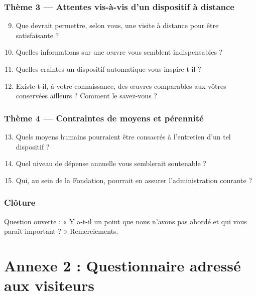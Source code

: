 \subsection*{Thème 3 — Attentes vis-à-vis d'un dispositif à distance}

\begin{enumerate}\setcounter{enumi}{8}
  \item Que devrait permettre, selon vous, une visite à distance pour être
        satisfaisante ?
  \item Quelles informations sur une œuvre vous semblent indispensables ?
  \item Quelles craintes un dispositif automatique vous inspire-t-il ?
  \item Existe-t-il, à votre connaissance, des œuvres comparables aux vôtres
        conservées ailleurs ? Comment le savez-vous ?
\end{enumerate}

\subsection*{Thème 4 — Contraintes de moyens et pérennité}

\begin{enumerate}\setcounter{enumi}{12}
  \item Quels moyens humains pourraient être consacrés à l'entretien d'un tel
        dispositif ?
  \item Quel niveau de dépense annuelle vous semblerait soutenable ?
  \item Qui, au sein de la Fondation, pourrait en assurer l'administration
        courante ?
\end{enumerate}

\subsection*{Clôture}

Question ouverte : « Y a-t-il un point que nous n'avons pas abordé et qui vous
paraît important ? » Remerciements.

\cleardoublepage
\chapter*{Annexe 2 : Questionnaire adressé aux visiteurs}
\label{ann:questionnaire}

